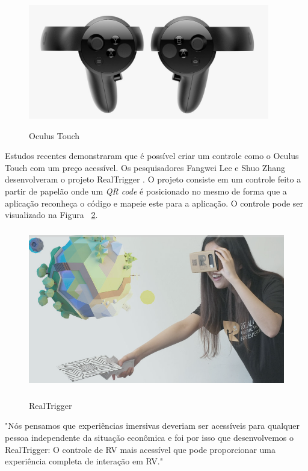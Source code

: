 \begin{figure}[H]
	\caption{\small Oculus Touch}
	\centering
	\includegraphics[height= 5cm]{Imagens/oculustouch.png}
	\label{f.oculustouch}
\end{figure}

Estudos recentes demonstraram que é possível criar um controle como o Oculus Touch com um preço acessível. Os pesquisadores Fangwei Lee e Shuo Zhang desenvolveram o projeto RealTrigger \cite{realtrigger}. O projeto consiste em um controle feito a partir de papelão onde um \textit{QR code} é posicionado no mesmo de forma que a aplicação reconheça o código e mapeie este para a aplicação. O controle pode ser visualizado na Figura ~\ref{f.realtrigger}. 

\begin{figure}[H]
	\caption{\small RealTrigger}
	\centering
	\includegraphics[height= 7cm]{Imagens/realtrigger.png}
	\label{f.realtrigger}
\end{figure}

\begin{citacao}
	"Nós pensamos que experiências imersivas deveriam ser acessíveis para qualquer pessoa independente da situação econômica e foi por isso que desenvolvemos o RealTrigger: O controle de RV mais acessível que pode proporcionar uma experiência completa de interação em RV." \cite[tradução nossa]{realiteer}
\end{citacao}

